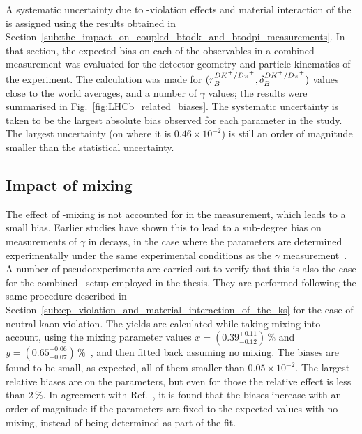 A systematic uncertainty due to \CP-violation effects and material interaction of the \KS is assigned using the results obtained in Section~\ref{sub:the_impact_on_coupled_btodk_and_btodpi_measurements}. In that section, the expected bias on each of the observables in a combined \BtoDh measurement was evaluated for the detector geometry and particle kinematics of the \lhcb experiment. The calculation was made for $(r_B^{{{D}{{K}^\pm}}/D\pi^\pm},\delta_B^{{{D}{{K}^\pm}}/D\pi^\pm})$ values close to the world averages, and a number of $\gamma$ values; the results were summarised in Fig.~\ref{fig:LHCb_related_biases}. 
The systematic uncertainty is taken to be the largest absolute bias observed for each parameter in the study. The largest uncertainty (on \yxidpi where it is $0.46\times 10^{-2}$) is still an order of magnitude smaller than the statistical uncertainty.
 


\subsection{Impact of \D mixing} %
\label{sub:impact_of_d_mixing}

The effect of \D-mixing is not accounted for in the measurement, which leads to a small bias. Earlier studies have shown this to lead to a sub-degree bias on measurements of $\gamma$ in \BtoDK decays, in the case where the \Fi parameters are determined experimentally under the same experimental conditions as the $\gamma$ measurement~\cite{Dmixing}. A number of pseudoexperiments are carried out to verify that this is also the case for the combined \DK--\Dpi setup employed in the thesis. They are performed following the same procedure described in Section~\ref{sub:cp_violation_and_material_interaction_of_the_ks} for the case of neutral-kaon \CP violation. The yields are calculated while taking \D mixing into account, using the mixing parameter values $x=(0.39^{+0.11}_{-0.12})\,\%$ and $y=(0.65^{+0.06}_{-0.07})\,\%$~\cite{PDG2020}, and then fitted back assuming no \D mixing. The biases are found to be small, as expected, all of them smaller than $0.05\times 10^{-2}$. The largest relative biases are on the \BtoDpi parameters, but even for those the relative effect is less than 2\,\%. In agreement with Ref.~\cite{Dmixing}, it is found that the biases increase with an order of magnitude if the \Fi parameters are fixed to the expected values with no \D-mixing, instead of being determined as part of the fit.

